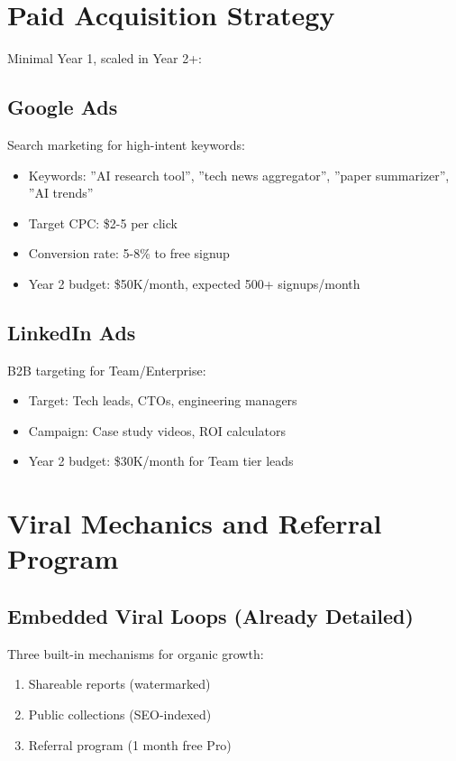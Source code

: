 \documentclass{report}
\begin{document}
\section{Paid Acquisition Strategy}

Minimal Year 1, scaled in Year 2+:

\subsection{Google Ads}

Search marketing for high-intent keywords:

\begin{itemize}
    \item Keywords: ''AI research tool'', ''tech news aggregator'', ''paper summarizer'', ''AI trends''
    \item Target CPC: \$2-5 per click
    \item Conversion rate: 5-8\% to free signup
    \item Year 2 budget: \$50K/month, expected 500+ signups/month
\end{itemize}

\subsection{LinkedIn Ads}

B2B targeting for Team/Enterprise:

\begin{itemize}
    \item Target: Tech leads, CTOs, engineering managers
    \item Campaign: Case study videos, ROI calculators
    \item Year 2 budget: \$30K/month for Team tier leads
\end{itemize}

\section{Viral Mechanics and Referral Program}

\subsection{Embedded Viral Loops (Already Detailed)}

Three built-in mechanisms for organic growth:

\begin{enumerate}
    \item Shareable reports (watermarked)
    \item Public collections (SEO-indexed)
    \item Referral program (1 month free Pro)
\end{enumerate}
\end{document}
